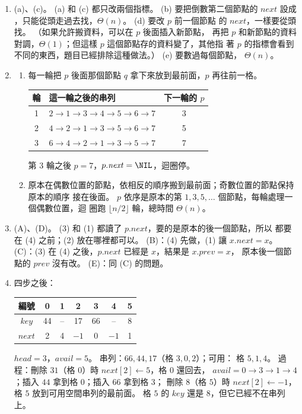\begin{enumerate}
\item (a)、(c)。 (a) 和 (c) 都只改兩個指標。 (b) 要把倒數第二個節點的
$\mathit{next}$ 設成 \NIL，只能從頭走過去找，$\Theta(n)$。 (d) 要改 $p$ 前一個節點
的 $\mathit{next}$，一樣要從頭找。 （如果允許搬資料，可以在 $p$ 後面插入新節點，
再把 $p$ 和新節點的資料對調，$\Theta(1)$；但這樣 $p$ 這個節點存的資料變了，其他指
著 $p$ 的指標會看到不同的東西，題目已經排除這種做法。） (e) 要數過每個節點，
$\Theta(n)$。

\item
\begin{enumerate}
\item 每一輪把 $p$ 後面那個節點 $q$ 拿下來放到最前面，$p$ 再往前一格。
\begin{center}
\begin{tabular}{clc}
\toprule
輪 & 這一輪之後的串列 & 下一輪的 $p$ \\
\midrule
1 & $2 \to 1 \to 3 \to 4 \to 5 \to 6 \to 7$ & 3 \\
2 & $4 \to 2 \to 1 \to 3 \to 5 \to 6 \to 7$ & 5 \\
3 & $6 \to 4 \to 2 \to 1 \to 3 \to 5 \to 7$ & 7 \\
\bottomrule
\end{tabular}
\end{center}
第 3 輪之後 $p = 7$，$p.\mathit{next} = \NIL$，迴圈停。
\item 原本在偶數位置的節點，依相反的順序搬到最前面；奇數位置的節點保持原本的順序
接在後面。 $p$ 依序是原本的第 $1, 3, 5, \ldots$ 個節點，每輪處理一個偶數位置，迴
圈跑 $\lfloor n/2 \rfloor$ 輪，總時間 $\Theta(n)$。
\end{enumerate}

\item (A)、(D)。 (3) 和 (1) 都讀了 $p.\mathit{next}$，要的是原本的後一個節點，所以
都要在 (4) 之前；(2) 放在哪裡都可以。 (B)：(4) 先做，(1) 讓 $x.\mathit{next} = x$。
(C)：(3) 在 (4) 之後，$p.\mathit{next}$ 已經是 $x$，結果是 $x.\mathit{prev} = x$，
原本後一個節點的 $\mathit{prev}$ 沒有改。 (E)：同 (C) 的問題。

\item 四步之後：
\begin{center}
\begin{tabular}{ccccccc}
\toprule
編號 & 0 & 1 & 2 & 3 & 4 & 5 \\
\midrule
$\mathit{key}$ & 44 & -- & 17 & 66 & -- & 8 \\
$\mathit{next}$ & 2 & 4 & $-1$ & 0 & $-1$ & 1 \\
\bottomrule
\end{tabular}
\end{center}
$\mathit{head} = 3$，$\mathit{avail} = 5$。 串列：$66, 44, 17$（格 $3, 0, 2$）；可用：
格 $5, 1, 4$。 過程：刪除 $31$（格 $0$）時 $\mathit{next}[2] \gets 5$，格 $0$ 還回去，
$\mathit{avail} = 0 \to 3 \to 1 \to 4$；插入 $44$ 拿到格 $0$；插入 $66$ 拿到格 $3$；
刪除 $8$（格 $5$）時 $\mathit{next}[2] \gets -1$，格 $5$ 放到可用空間串列的最前面。
格 $5$ 的 $\mathit{key}$ 還是 $8$，但它已經不在串列上。


\end{enumerate}

